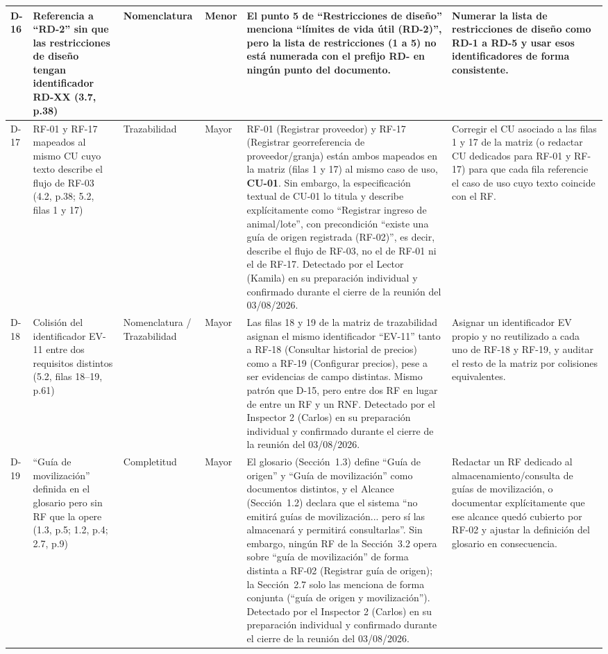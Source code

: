 \documentclass[11pt,a4paper]{article}
\begin{document}
\begin{longtable}{|p{0.6cm}|p{3cm}|p{2.5cm}|p{0.9cm}|p{4.3cm}|p{1.8cm}|}
\hline
D-16 & Referencia a ``RD-2'' sin que las restricciones de diseño tengan identificador RD-XX (3.7, p.38) & Nomenclatura & Menor & El punto 5 de ``Restricciones de diseño'' menciona ``límites de vida útil (RD-2)'', pero la lista de restricciones (1 a 5) no está numerada con el prefijo RD- en ningún punto del documento. & Numerar la lista de restricciones de diseño como RD-1 a RD-5 y usar esos identificadores de forma consistente. \\
\hline
D-17 & RF-01 y RF-17 mapeados al mismo CU cuyo texto describe el flujo de RF-03 (4.2, p.38; 5.2, filas 1 y 17) & Trazabilidad & Mayor & RF-01 (Registrar proveedor) y RF-17 (Registrar georreferencia de proveedor/granja) están ambos mapeados en la matriz (filas 1 y 17) al mismo caso de uso, \textbf{CU-01}. Sin embargo, la especificación textual de CU-01 lo titula y describe explícitamente como ``Registrar ingreso de animal/lote'', con precondición ``existe una guía de origen registrada (RF-02)'', es decir, describe el flujo de RF-03, no el de RF-01 ni el de RF-17. Detectado por el Lector (Kamila) en su preparación individual y confirmado durante el cierre de la reunión del 03/08/2026. & Corregir el CU asociado a las filas 1 y 17 de la matriz (o redactar CU dedicados para RF-01 y RF-17) para que cada fila referencie el caso de uso cuyo texto coincide con el RF. \\
\hline
D-18 & Colisión del identificador EV-11 entre dos requisitos distintos (5.2, filas 18--19, p.61) & Nomenclatura / Trazabilidad & Mayor & Las filas 18 y 19 de la matriz de trazabilidad asignan el mismo identificador ``EV-11'' tanto a RF-18 (Consultar historial de precios) como a RF-19 (Configurar precios), pese a ser evidencias de campo distintas. Mismo patrón que D-15, pero entre dos RF en lugar de entre un RF y un RNF. Detectado por el Inspector 2 (Carlos) en su preparación individual y confirmado durante el cierre de la reunión del 03/08/2026. & Asignar un identificador EV propio y no reutilizado a cada uno de RF-18 y RF-19, y auditar el resto de la matriz por colisiones equivalentes. \\
\hline
D-19 & ``Guía de movilización'' definida en el glosario pero sin RF que la opere (1.3, p.5; 1.2, p.4; 2.7, p.9) & Completitud & Mayor & El glosario (Sección~1.3) define ``Guía de origen'' y ``Guía de movilización'' como documentos distintos, y el Alcance (Sección~1.2) declara que el sistema ``no emitirá guías de movilización... pero sí las almacenará y permitirá consultarlas''. Sin embargo, ningún RF de la Sección~3.2 opera sobre ``guía de movilización'' de forma distinta a RF-02 (Registrar guía de origen); la Sección~2.7 solo las menciona de forma conjunta (``guía de origen y movilización''). Detectado por el Inspector 2 (Carlos) en su preparación individual y confirmado durante el cierre de la reunión del 03/08/2026. & Redactar un RF dedicado al almacenamiento/consulta de guías de movilización, o documentar explícitamente que ese alcance quedó cubierto por RF-02 y ajustar la definición del glosario en consecuencia. \\
\hline
\end{longtable}
\end{document}
